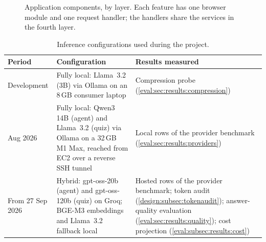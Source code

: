 \begin{figure}[htb]
  \centering
  
  \caption{Application components, by layer. Each feature has one browser
           module and one request handler; the handlers share the services
           in the fourth layer.}
  \label{impl:fig:components}
\end{figure}

\begin{table}[htb]
  \centering
  \caption{Inference configurations used during the project.}
  \label{impl:tab:configs}
  \footnotesize
  \renewcommand{\arraystretch}{1.3}
  \begin{tabular}{L{0.14\textwidth} L{0.37\textwidth} L{0.37\textwidth}}
    \hline
    \textbf{Period} & \textbf{Configuration} & \textbf{Results measured} \\
    \hline
    Development &
      Fully local: Llama~3.2 (3B) via Ollama on an 8\,GB consumer laptop &
      Compression probe (\autoref{eval:sec:results:compression}) \\
    Aug 2026 &
      Fully local: Qwen3 14B (agent) and Llama~3.2 (quiz) via Ollama on a
      32\,GB M1 Max, reached from EC2 over a reverse SSH tunnel &
      Local rows of the provider benchmark
      (\autoref{eval:sec:results:providers}) \\
    From 27 Sep 2026 &
      Hybrid: gpt-oss-20b (agent) and gpt-oss-120b (quiz) on Groq; BGE-M3
      embeddings and Llama~3.2 fallback local &
      Hosted rows of the provider benchmark; token audit
      (\autoref{design:subsec:tokenaudit}); answer-quality evaluation
      (\autoref{eval:sec:results:quality}); cost projection
      (\autoref{eval:subsec:results:cost}) \\
    \hline
  \end{tabular}
\end{table}

